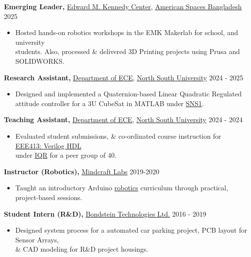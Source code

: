 \documentclass[11pt,a4paper]{article}
\newcommand{\experienceitem}[3]{
  \textbf{#1} {#2} \hfill {\footnotesize{#3}} 
}
\begin{document}
  \experienceitem
  {Emerging Leader, }
  {{\href{https://emkcenter.org}{Edward M. Kennedy Center}}, {\href{https://bd.usembassy.gov/education/american-spaces/}{American Spaces Bangladesh}}}
  {2025}
  \begin{itemize}
    \item Hosted hands-on robotics workshops in the EMK Makerlab for school, and university  \\students. Also, processed \& delivered 3D Printing projects using Prusa and SOLIDWORKS.
  \end{itemize}
  \experienceitem
  {Research Assistant, }
  {\href{https://ece.northsouth.edu}{Department of ECE}, \href{https://ece.northsouth.edu}{North South University}}
  {2024 - 2025}
  \begin{itemize}
    \item Designed and implemented a Quaternion-based Linear Quadratic Regulated \\ attitude controller for a 3U CubeSat in MATLAB under {\href{https://scholar.google.com/citations?hl=en&user=6XLqr5QAAAAJ}{SNS1}}.
  \end{itemize}
  \experienceitem
  {Teaching Assistant, }
  {\href{https://ece.northsouth.edu}{Department of ECE}, \href{https://ece.northsouth.edu}{North South University}}
  {2024 - 2024}
  \begin{itemize}
    \item  Evaluated student submissions, \& co-ordinated course instruction for \href{https://ece.northsouth.edu/courses/cse-413-verilog-hdl-modelling-simulation-and-synthesis/}{EEE413: Verilog HDL} \\under \href{https://ece.northsouth.edu/people/iqbalur-rokon/}{IQR} for a peer group of 40.
  \end{itemize}
  \experienceitem
  {Instructor (Robotics), }
  {\href{https://www.facebook.com/MindcraftLabs/about}{Mindcraft Labs}}
  {2019-2020}
  \begin{itemize}
    \item Taught an introductory Arduino {\href{https://www.facebook.com/photo/?fbid=526359588210282&set=a.526359548210286}{robotics}} curriculum through practical, project-based sessions.
  \end{itemize}
  \experienceitem
  {Student Intern (R\&D), }
  {\href{https://bondstein.com}{Bondstein Technologies Ltd.}}
  {2016 - 2019}
  \begin{itemize}
    \item Designed system process for a automated car parking project, PCB layout for Sensor Arrays,\\ \& CAD modeling for R\&D project housings.
  \end{itemize}
\end{document}
